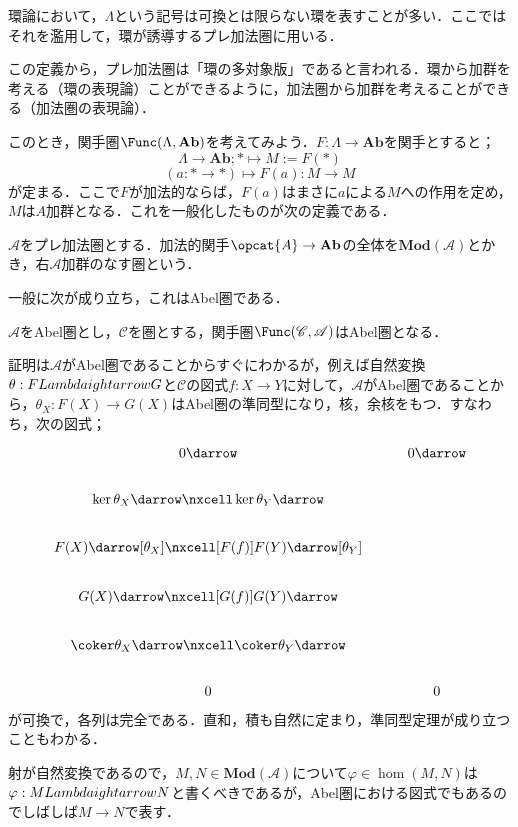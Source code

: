 環論において，$\Lambda$という記号は可換とは限らない環を表すことが多い．ここではそれを濫用して，環が誘導するプレ加法圏に用いる．

この定義から，プレ加法圏は「環の多対象版」であると言われる．環から加群を考える（環の表現論）ことができるように，加法圏から加群を考えることができる（加法圏の表現論）．

このとき，関手圏$\Func(\Lambda,\mathbf{Ab})$を考えてみよう．$F:\Lambda\to\mathbf{Ab}$を関手とすると；
\[\Lambda\to\mathbf{Ab};*\mapsto M:=F(*)\]
\[(a:*\to *)\mapsto F(a):M\to M\]
が定まる．ここで$F$が加法的ならば，$F(a)$はまさに$a$による$M$への作用を定め，$M$は$A$加群となる．これを一般化したものが次の定義である．

\begin{defi}
	$\mathscr{A}$をプレ加法圏とする．加法的関手$\opcat{A}\to\mathbf{Ab}$の全体を$\mathbf{Mod}(\mathscr{A})$とかき，右$\mathscr{A}$加群のなす圏という．
\end{defi}

一般に次が成り立ち，これはAbel圏である．

\begin{thm}
	$\mathscr{A}$をAbel圏とし，$\mathscr{C}$を圏とする，関手圏$\Func(\mathscr{C},\mathscr{A})$はAbel圏となる．
\end{thm}

証明は$\mathscr{A}$がAbel圏であることからすぐにわかるが，例えば自然変換$\theta:F\\Lambdaightarrow G$と$\mathscr{C}$の図式$f:X\to Y$に対して，$\mathscr{A}$がAbel圏であることから，$\theta_X:F(X)\to G(X)$はAbel圏の準同型になり，核，余核をもつ．すなわち，次の図式；
\[\begin{tikzcd}
	0\darrow&0\darrow\\
	\ker\theta_X\darrow\nxcell\ker\theta_Y\darrow\\
	F(X)\darrow[\theta_X]\nxcell[F(f)]F(Y)\darrow[\theta_Y]\\
	G(X)\darrow\nxcell[G(f)]G(Y)\darrow\\
	\coker\theta_X\darrow\nxcell\coker\theta_Y\darrow\\
	0&0
\end{tikzcd}\]
が可換で，各列は完全である．直和，積も自然に定まり，準同型定理が成り立つこともわかる．

射が自然変換であるので，$M,N\in\mathbf{Mod}(\mathscr{A})$について$\varphi\in\hom(M,N)$は$\varphi:M\\Lambdaightarrow N$と書くべきであるが，Abel圏における図式でもあるのでしばしば$M\to N$で表す．


